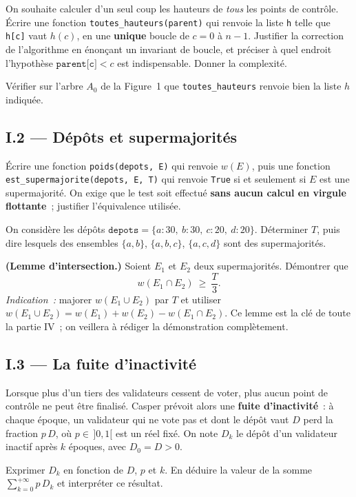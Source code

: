 \documentclass[11pt,a4paper]{article}
\begin{document}
\Q On souhaite calculer d'un seul coup les hauteurs de \emph{tous} les points de contrôle.
Écrire une fonction \texttt{toutes\_hauteurs(parent)} qui renvoie la liste \texttt{h} telle que
\texttt{h[c]} vaut $h(c)$, en une \textbf{unique} boucle de $c=0$ à $n-1$. Justifier la
correction de l'algorithme en énonçant un invariant de boucle, et préciser à quel endroit
l'hypothèse $\texttt{parent[c]}<c$ est indispensable. Donner la complexité.

\Q Vérifier sur l'arbre $A_0$ de la Figure~1 que \texttt{toutes\_hauteurs} renvoie bien la
liste $h$ indiquée.

\subsection*{I.2 --- Dépôts et supermajorités}

\Q Écrire une fonction \texttt{poids(depots, E)} qui renvoie $w(E)$, puis une fonction
\texttt{est\_supermajorite(depots, E, T)} qui renvoie \texttt{True} si et seulement si $E$ est
une supermajorité. On exige que le test soit effectué \textbf{sans aucun calcul en virgule
flottante}~; justifier l'équivalence utilisée.

\Q On considère les dépôts $\texttt{depots} = \{a:30,\ b:30,\ c:20,\ d:20\}$. Déterminer
$T$, puis dire lesquels des ensembles $\{a,b\}$, $\{a,b,c\}$, $\{a,c,d\}$ sont des
supermajorités.

\Q \textbf{(Lemme d'intersection.)} Soient $E_1$ et $E_2$ deux supermajorités. Démontrer
que \[ w(E_1\cap E_2)\ \ge\ \frac{T}{3}. \] \emph{Indication~:} majorer $w(E_1\cup E_2)$
par $T$ et utiliser $w(E_1\cup E_2)=w(E_1)+w(E_2)-w(E_1\cap E_2)$. Ce lemme est la clé de
toute la partie IV~; on veillera à rédiger la démonstration complètement.

\subsection*{I.3 --- La fuite d'inactivité}

Lorsque plus d'un tiers des validateurs cessent de voter, plus aucun point de contrôle ne
peut être finalisé. Casper prévoit alors une \textbf{fuite d'inactivité}~: à chaque époque,
un validateur qui ne vote pas et dont le dépôt vaut $D$ perd la fraction $p\,D$, où
$p\in\,]0,1[$ est un réel fixé. On note $D_k$ le dépôt d'un validateur inactif après $k$
époques, avec $D_0=D>0$.

\Q Exprimer $D_k$ en fonction de $D$, $p$ et $k$. En déduire la valeur de la somme
$\displaystyle\sum_{k=0}^{+\infty} p\,D_k$ et interpréter ce résultat.
\end{document}
